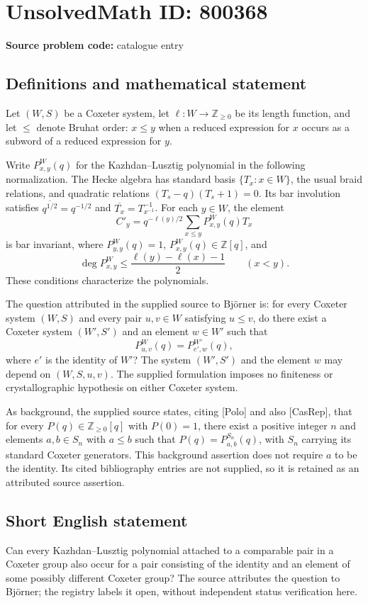 \documentclass[11pt]{article}
\newcommand{\Z}{\mathbb{Z}}
\begin{document}
\section*{UnsolvedMath ID: 800368}
\textbf{Source problem code:} catalogue entry
\subsection{Definitions and mathematical statement}
Let \((W,S)\) be a Coxeter system, let \(\ell\colon W\to\Z_{\geq 0}\) be its length function, and let \(\leq\) denote Bruhat order: \(x\leq y\) when a reduced expression for \(x\) occurs as a subword of a reduced expression for \(y\).

Write \(P^W_{x,y}(q)\) for the Kazhdan--Lusztig polynomial in the following normalization. The Hecke algebra has standard basis \(\{T_x:x\in W\}\), the usual braid relations, and quadratic relations \((T_s-q)(T_s+1)=0\). Its bar involution satisfies \(\overline{q^{1/2}}=q^{-1/2}\) and \(\overline{T_x}=T_{x^{-1}}^{-1}\). For each \(y\in W\), the element
\[
C'_y=q^{-\ell(y)/2}\sum_{x\leq y}P^W_{x,y}(q)T_x
\]
is bar invariant, where \(P^W_{y,y}(q)=1\), \(P^W_{x,y}(q)\in\Z[q]\), and
\[
\deg P^W_{x,y}\leq \frac{\ell(y)-\ell(x)-1}{2}\qquad(x<y).
\]
These conditions characterize the polynomials.

The question attributed in the supplied source to Bj\"{o}rner is: for every Coxeter system \((W,S)\) and every pair \(u,v\in W\) satisfying \(u\leq v\), do there exist a Coxeter system \((W',S')\) and an element \(w\in W'\) such that
\[
P^W_{u,v}(q)=P^{W'}_{e',w}(q),
\]
where \(e'\) is the identity of \(W'\)? The system \((W',S')\) and the element \(w\) may depend on \((W,S,u,v)\). The supplied formulation imposes no finiteness or crystallographic hypothesis on either Coxeter system.

As background, the supplied source states, citing [Polo] and also [CasRep], that for every \(P(q)\in\Z_{\geq 0}[q]\) with \(P(0)=1\), there exist a positive integer \(n\) and elements \(a,b\in S_n\) with \(a\leq b\) such that \(P(q)=P^{S_n}_{a,b}(q)\), with \(S_n\) carrying its standard Coxeter generators. This background assertion does not require \(a\) to be the identity. Its cited bibliography entries are not supplied, so it is retained as an attributed source assertion.
\subsection{Short English statement}
Can every Kazhdan--Lusztig polynomial attached to a comparable pair in a Coxeter group also occur for a pair consisting of the identity and an element of some possibly different Coxeter group? The source attributes the question to Bj\"{o}rner; the registry labels it open, without independent status verification here.
\end{document}
